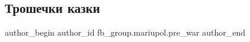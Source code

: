  
 
 
 
 

\subsection{Трошечки казки}
\label{sec:04_02_2023.fb.fb_group.mariupol.pre_war.4.troshechki_kazki}

\ifcmt
 author_begin
   author_id fb_group.mariupol.pre_war
 author_end
\fi

